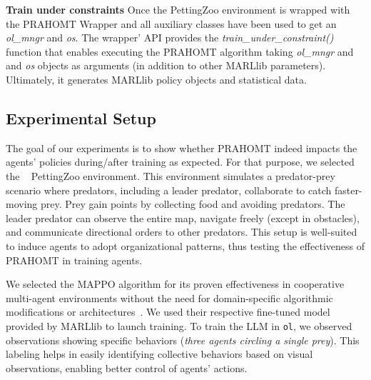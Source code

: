 \documentclass[runningheads]{llncs}
\theoremstyle{freethm}
\theoremstyle{proofoutline}
\begin{document}
\textbf{Train under constraints} \quad Once the PettingZoo environment is wrapped with the PRAHOMT Wrapper and all auxiliary classes have been used to get an \textit{ol\_mngr} and \textit{os}. The wrapper' API provides the \textit{train\_under\_constraint()} function that enables executing the PRAHOMT algorithm taking \textit{ol\_mngr} and and \textit{os} objects as arguments (in addition to other MARLlib parameters). Ultimately, it generates MARLlib policy objects and statistical data.


\subsection{Experimental Setup}

The goal of our experiments is to show whether PRAHOMT indeed impacts the agents' policies during/after training as expected. For that purpose, we selected the ~\cite{Lowe2017} PettingZoo environment. This environment simulates a predator-prey scenario where predators, including a leader predator, collaborate to catch faster-moving prey. Prey gain points by collecting food and avoiding predators. The leader predator can observe the entire map, navigate freely (except in obstacles), and communicate directional orders to other predators. This setup is well-suited to induce agents to adopt organizational patterns, thus testing the effectiveness of PRAHOMT in training agents.



\noindent We selected the MAPPO algorithm for its proven effectiveness in cooperative multi-agent environments without the need for domain-specific algorithmic modifications or architectures~\cite{Yu2022}. We used their respective fine-tuned model provided by MARLlib to launch training.
%
To train the LLM in \texttt{ol}, we observed observations showing specific behaviors (\textit{three agents circling a single prey}). This labeling helps in easily identifying collective behaviors based on visual observations, enabling better control of agents' actions.
\end{document}
